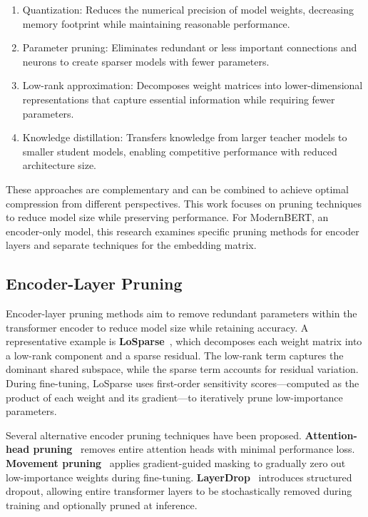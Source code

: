 \documentclass[twocolumn]{article}
\begin{document}
\begin{enumerate}
    \item Quantization: Reduces the numerical precision of model weights, decreasing memory footprint while maintaining reasonable performance.
    \item Parameter pruning: Eliminates redundant or less important connections and neurons to create sparser models with fewer parameters.
    \item Low-rank approximation: Decomposes weight matrices into lower-dimensional representations that capture essential information while requiring fewer parameters.
    \item Knowledge distillation: Transfers knowledge from larger teacher models to smaller student models, enabling competitive performance with reduced architecture size.
\end{enumerate}
These approaches are complementary and can be combined to achieve optimal compression from different perspectives. 
This work focuses on pruning techniques to reduce model size while preserving performance.
For ModernBERT, an encoder-only model, this research examines specific pruning methods for encoder layers and separate techniques for the embedding matrix.

\subsection{Encoder-Layer Pruning}

Encoder-layer pruning methods aim to remove redundant parameters within the transformer encoder to reduce model size while retaining accuracy. A representative example is \textbf{LoSparse}~\cite{li2023losparse}, which decomposes each weight matrix into a low-rank component and a sparse residual. The low-rank term captures the dominant shared subspace, while the sparse term accounts for residual variation. During fine-tuning, LoSparse uses first-order sensitivity scores—computed as the product of each weight and its gradient—to iteratively prune low-importance parameters. 

Several alternative encoder pruning techniques have been proposed. \textbf{Attention-head pruning}~\cite{michel2019sixteen} removes entire attention heads with minimal performance loss. \textbf{Movement pruning}~\cite{sanh2020movement} applies gradient-guided masking to gradually zero out low-importance weights during fine-tuning. \textbf{LayerDrop}~\cite{fan2020layerdrop} introduces structured dropout, allowing entire transformer layers to be stochastically removed during training and optionally pruned at inference.
\end{document}
